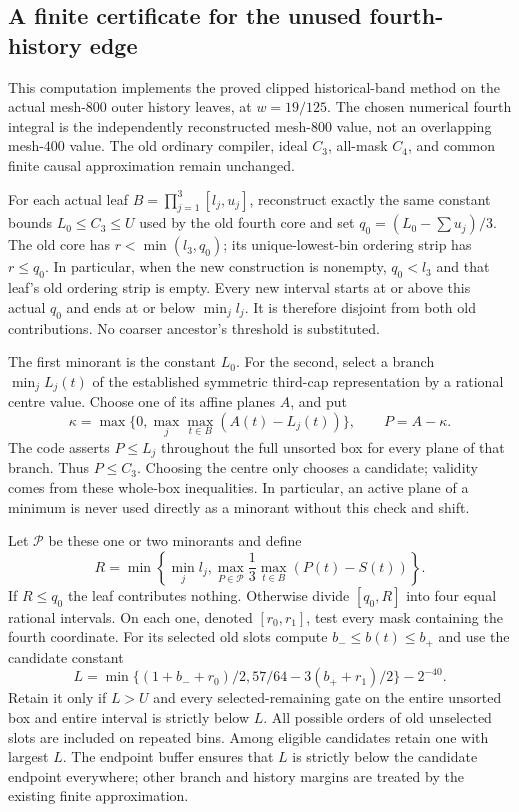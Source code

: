 \subsection{A finite certificate for the unused fourth-history edge}

This computation implements the proved clipped historical-band method
on the actual mesh-$800$ outer history leaves, at $w=19/125$. The
chosen numerical fourth integral is the independently reconstructed
mesh-$800$ value, not an overlapping mesh-$400$ value. The old ordinary
compiler, ideal $C_3$, all-mask $C_4$, and common finite causal
approximation remain unchanged.

For each actual leaf $B=\prod_{j=1}^3[l_j,u_j]$, reconstruct exactly
the same constant bounds $L_0\le C_3\le U$ used by the old fourth
core and set $q_0=(L_0-\sum u_j)/3$. The old core has
$r<\min(l_3,q_0)$; its unique-lowest-bin ordering strip has
$r\le q_0$. In particular, when the new construction is nonempty,
$q_0<l_3$ and that leaf's old ordering strip is empty. Every new
interval starts at or above this actual $q_0$ and ends at or below
$\min_j l_j$. It is therefore disjoint from both old contributions.
No coarser ancestor's threshold is substituted.

The first minorant is the constant $L_0$. For the second, select a
branch $\min_j L_j(t)$ of the established symmetric third-cap
representation by a rational centre value. Choose one of its affine
planes $A$, and put
\[
 \kappa=\max\{0,\max_j\max_{t\in B}(A(t)-L_j(t))\},
 \qquad P=A-\kappa.
\]
The code asserts $P\le L_j$ throughout the full unsorted box for
every plane of that branch. Thus $P\le C_3$. Choosing the centre
only chooses a candidate; validity comes from these whole-box
inequalities. In particular, an active plane of a minimum is never
used directly as a minorant without this check and shift.

Let $\mathcal P$ be these one or two minorants and define
\[
 R=\min\left\{\min_j l_j,
       \max_{P\in\mathcal P}\frac13\max_{t\in B}(P(t)-S(t))\right\}.
\]
If $R\le q_0$ the leaf contributes nothing. Otherwise divide
$[q_0,R]$ into four equal rational intervals. On each one, denoted
$[r_0,r_1]$, test every mask containing the fourth coordinate.
For its selected old slots compute $b_-\le b(t)\le b_+$ and use
the candidate constant
\[
 L=\min\{(1+b_-+r_0)/2,57/64-3(b_++r_1)/2\}-2^{-40}.
\]
Retain it only if $L>U$ and every selected-remaining gate on the
entire unsorted box and entire interval is strictly below $L$.
All possible orders of old unselected slots are included on repeated
bins. Among eligible candidates retain one with largest $L$.
The endpoint buffer ensures that $L$ is strictly below the candidate
endpoint everywhere; other branch and history margins are treated
by the existing finite approximation.

